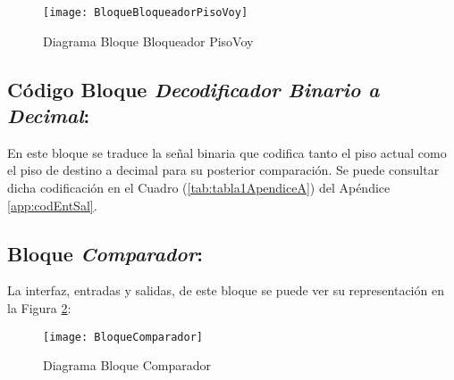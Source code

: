     
    \begin{figure}[H]
		    \centering
		    \hspace*{-1.8cm}
		    \texttt{[image: BloqueBloqueadorPisoVoy]}
		    \caption{Diagrama Bloque Bloqueador PisoVoy}
		    \label{fig:BloqueBloqueadorPisoVoy}
	\end{figure}
	
\subsection{Código Bloque \textit{Decodificador Binario a Decimal}:} 
	En este bloque se traduce la señal binaria que codifica tanto el piso actual como el piso de destino a decimal para su posterior comparación.
	Se puede consultar dicha codificación en el Cuadro (\ref{tab:tabla1ApendiceA}) del Apéndice \ref{app:codEntSal}. \\ 
	
\subsection{Bloque \textit{Comparador}:}

    La interfaz, entradas y salidas, de este bloque se puede ver su representación en la Figura \ref{fig:BloqueComparador}:
    
    \begin{figure}[H]
		    \centering
		    \texttt{[image: BloqueComparador]}
		    \caption{Diagrama Bloque Comparador}
		    \label{fig:BloqueComparador}
	\end{figure}